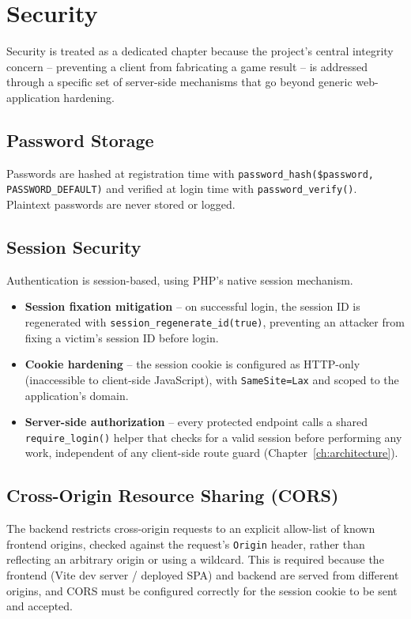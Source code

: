\chapter{Security}
\label{ch:security}

Security is treated as a dedicated chapter because the project's central
integrity concern -- preventing a client from fabricating a game result --
is addressed through a specific set of server-side mechanisms that go beyond
generic web-application hardening.

\section{Password Storage}
Passwords are hashed at registration time with
\texttt{password\_hash(\$password, PASSWORD\_DEFAULT)} and verified at login
time with \texttt{password\_verify()}. Plaintext passwords are never stored
or logged.

\section{Session Security}
\label{sec:session-security}
Authentication is session-based, using PHP's native session mechanism.
\begin{itemize}[nosep]
    \item \textbf{Session fixation mitigation} -- on successful login, the
    session ID is regenerated with \texttt{session\_regenerate\_id(true)},
    preventing an attacker from fixing a victim's session ID before login.
    \item \textbf{Cookie hardening} -- the session cookie is configured as
    HTTP-only (inaccessible to client-side JavaScript), with
    \texttt{SameSite=Lax} and scoped to the application's domain.
    \item \textbf{Server-side authorization} -- every protected endpoint
    calls a shared \texttt{require\_login()} helper that checks for a valid
    session before performing any work, independent of any client-side
    route guard (Chapter~\ref{ch:architecture}).
\end{itemize}

\section{Cross-Origin Resource Sharing (CORS)}
The backend restricts cross-origin requests to an explicit allow-list of
known frontend origins, checked against the request's \texttt{Origin}
header, rather than reflecting an arbitrary origin or using a wildcard.
This is required because the frontend (Vite dev server / deployed SPA) and
backend are served from different origins, and CORS must be configured
correctly for the session cookie to be sent and accepted.

